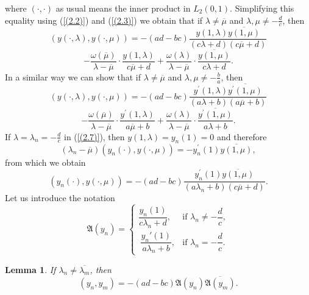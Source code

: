 \documentclass[10pt,a4paper]{amsart}
\newtheorem{lem}[thm]{Lemma}
\numberwithin{equation}{section}
\begin{document}
where $(\cdot ,\cdot )$ as usual means the inner product in $L_{2}(0,1)$.
Simplifying this equality  using (\ref{(2.2)}) and (\ref{(2.3)}) we obtain that if $\lambda \ne\overline
{\mu}$ and $\lambda,
{\mu}\ne-\frac{d}{c}$, then
$$
\left(y(\cdot,\lambda), y(\cdot,\mu)\right)
= -(ad - bc)\frac{y(1,\lambda)\overline{y(1,\mu)}}{(c\lambda + d)(c\overline{\mu} + d)}
$$
\begin{equation}
- \frac{\omega(\overline{\mu})}{\lambda - \overline{\mu}} \cdot \frac{y(1,\lambda)}{c\overline{\mu} + d}
+ \frac{\omega(\lambda)}{\lambda - \overline{\mu}} \cdot \frac{\overline{y(1,\mu)}}{c\lambda + d}.\label{(2.8)}
\end{equation}
In a similar way we can show that 
if $\lambda \ne\overline
{\mu}$ and $\lambda,
{\mu}\ne-\frac{b}{a}$, then
\[
\left(y(\cdot,\lambda), y(\cdot,\mu)\right)
= -(ad - bc)\frac{y^\prime(1,\lambda)\overline{y^\prime(1,\mu)}}{(a\lambda + b)(a\overline{\mu} + b)}
\]
\begin{equation}
- \frac{\omega(\overline{\mu})}{\lambda - \overline{\mu}} \cdot \frac{y^\prime(1,\lambda)}{a\overline{\mu} + b}
+ \frac{\omega(\lambda)}{\lambda - \overline{\mu}} \cdot \frac{\overline{y^\prime(1,\mu)}}{a\lambda + b}.\label{(2.9)}
\end{equation}
If  $\lambda=\lambda_n=-\frac{d}{c}$ in (\ref{(2.7)}), then  $y(1,\lambda)=y_n(1)=0$ and therefore  $$
(\lambda_n - \overline
{\mu})\left(y_n(\cdot),y(\cdot,\mu)\right)= -y_n^{\prime
}(1)\overline{y(1,\mu)},
 $$
from which we obtain 
\begin{equation}
\left(y_n(\cdot), y(\cdot,\mu)\right)
= -(ad - bc)\frac{y_n^\prime(1)\overline{y(1,\mu)}}{(a\lambda_n + b)(c\overline{\mu} + d)}. \label{(2.10)}
\end{equation}
Let us introduce the notation 
\begin{equation}
\mathfrak{A}(y_n) =
\begin{cases}
\displaystyle  
\dfrac{y_n(1)}{c\lambda_n + d}, 
& \text{if } \lambda_n \neq -\dfrac{d}{c}, \\[10pt]
\displaystyle \ 
\dfrac{y_n'(1)}{a\lambda_n + b}, 
& \text{if } \lambda_n = -\dfrac{d}{c}.
\end{cases}\label{(2.11)}
\end{equation}
\begin{lem}
If $\lambda _{n}\ne \overline{\lambda _{m}}$, then 
\begin{equation}
\left( y_{n},y_{m} \right) = - (ad-bc)\mathfrak{A}(y_n) \overline{\mathfrak{A}(y_m)} .\label{(2.12)}
\end{equation}
\end{lem}
\end{document}
